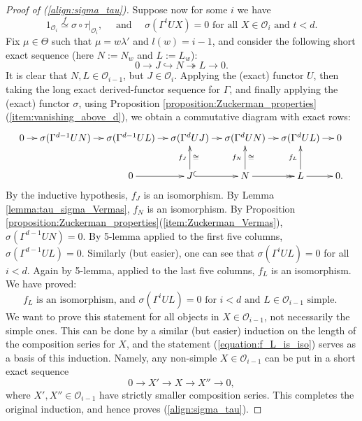 \documentclass[a4paper,10pt]{article}
\begin{document}
\begin{proof}[Proof of (\ref{align:sigma_tau})]
Suppose now for some $i$ we have
%
\[ 1_{\mathcal{O}_i} \stackrel{f}{\simeq} \sigma \circ \tau |_{\mathcal{O}_i}, \quad \text{ and } \quad \sigma (\Gamma^t U X) =0 \text{ for all $X \in \mathcal{O}_i$ and $t<d$}. \]
%
Fix $\mu \in \Theta$ such that $\mu=w \lambda'$ and $l(w)=i-1$, and consider the following short exact sequence (here $N:=N_w$ and $L:=L_w$):
%
\[ 0 \to J \hookrightarrow N \twoheadrightarrow L \to 0. \]
%
It is clear that $N, L \in \mathcal{O}_{i-1}$, but $J \in \mathcal{O}_{i}$.
Applying the (exact) functor $U$, then taking the long exact derived-functor sequence for $\Gamma$, and finally applying the (exact) functor $\sigma$, using Proposition \ref{proposition:Zuckerman_properties}(\ref{item:vanishing_above_d}), we obtain a commutative diagram with exact rows:
%
\[ \xymatrix@C=1em{ 0 \ar[r] & \sigma(\Gamma^{d-1}UN) \ar[r] & \sigma(\Gamma^{d-1}UL) \ar[r] & \sigma(\Gamma^{d}UJ) \ar[r] & \sigma(\Gamma^{d}UN) \ar[r] & \sigma(\Gamma^{d}UL) \ar[r] & 0 \\
&&0 \ar[r]  & J \ar[u]^{f_J}_\cong \ar@{^{(}->}[r] & N  \ar[u]^{f_N}_\cong \ar@{->>}[r] & L \ar[u]^{f_L} \ar[r] & 0 .}  \]
%
By the inductive hypothesis, $f_J$ is an isomorphism. By Lemma \ref{lemma:tau_sigma_Vermas}, $f_N$ is an isomorphism. By Proposition \ref{proposition:Zuckerman_properties}(\ref{item:Zuckerman_Vermas}), $\sigma(\Gamma^{d-1}UN)=0$. By 5-lemma applied to the first five columns, $\sigma(\Gamma^{d-1}UL)=0$. Similarly (but easier), one can see that $\sigma(\Gamma^{i}UL)=0$ for all $i<d$. Again by 5-lemma, applied to the last five columns, $f_L$ is an isomorphism. We have proved:
%
\begin{equation}
\label{equation:f_L_is_iso}
f_L \text{ is an isomorphism, and } \sigma(\Gamma^{i}UL)=0 \text{ for $i<d$ and $L \in \mathcal{O}_{i-1}$ simple. } \end{equation}
%
We want to prove this statement for all objects in $X \in \mathcal{O}_{i-1}$, not necessarily the simple ones. This can be done by a similar (but easier) induction on the length of the composition series for $X$, and the statement (\ref{equation:f_L_is_iso}) serves as a basis of this induction. Namely, any non-simple $X \in \mathcal{O}_{i-1}$ can be put in a short exact sequence
%
\[ 0 \to X' \to X \to X'' \to 0, \] 
%
where $X',X'' \in \mathcal{O}_{i-1}$ have strictly smaller composition series. This completes the original induction, and hence proves (\ref{align:sigma_tau}).
\end{proof}
\end{document}
